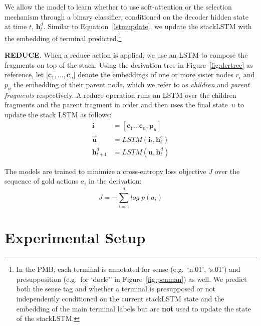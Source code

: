 \documentclass[11pt,a4paper]{article}
\theoremstyle{plain}
\begin{document}
We allow the model to learn whether to use soft-attention or the
selection mechanism through a binary classifier, conditioned on the
decoder hidden state at time $t$, $\mathbf{h}^{d}_t$. Similar to Equation~\eqref{lstmupdate}, we update the
stackLSTM with the embedding of terminal predicted.\footnote{In the PMB, each terminal is annotated for sense (e.g.~`n.01', `s.01') and presupposition (e.g.~for `dock$^{p}$' in Figure~\ref{fig:penman}) as well. We predict both the sense tag and whether a terminal is presupposed or not independently conditioned on the current stackLSTM state and the embedding of the main terminal labels but are \textbf{not} used to update the state of the stackLSTM.}

\textbf{REDUCE}. When a reduce action is applied, we
use an LSTM to compose the fragments on top of the stack. Using the
derivation tree in Figure~\ref{fig:dertree} as reference, let
[$\mathbf{c}_1,...,\mathbf{c}_n$] denote the embeddings of one or more sister nodes $r_i$ and $p_u$ the embedding of their parent node, which we refer to as \textit{children} and \textit{parent fragments} respectively. A
reduce operation runs an LSTM over the children fragments and the
parent fragment in order and then uses the final state~$u$ to update
the stack LSTM as follows:
\begin{equation}
\begin{aligned}
\mathbf{i} &= [\mathbf{c}_1 ...\mathbf{c}_n, \mathbf{p}_u]\nonumber\\
\overrightarrow{\mathbf{u}} &= LSTM(\mathbf{i}_t, \mathbf{h}_t^c)\nonumber\\
\mathbf{h}^{d}_{t+1} &= LSTM(\mathbf{u}, \mathbf{h}^{d}_t)
\end{aligned}
\end{equation}

The models are trained to minimize a cross-entropy loss objective $J$ over the sequence of gold actions $a_i$ in the derivation:
\begin{equation}
J = - \sum^{|a|}_{i=1}log \; p(a_i)
\end{equation}

\section{Experimental Setup}
\label{sec:experimental-setup}
\end{document}
